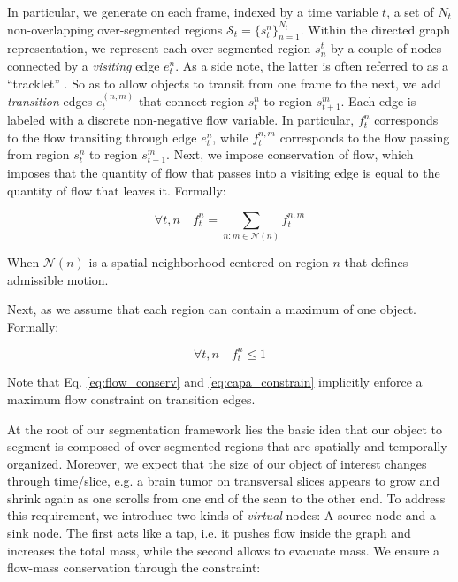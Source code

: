 In particular, we generate on each frame, indexed by a time variable $t$, a set of $N_{t}$ non-overlapping over-segmented regions $\mathcal{S}_{t}=\{s_{t}^{n}\}_{n=1}^{N_{t}}$.
Within the directed graph representation, we represent each over-segmented region $s^{t}_{n}$ by a couple of nodes connected by a \textit{visiting} edge $e^{n}_{t}$.
As a side note, the latter is often referred to as a ``tracklet'' \cite{zhang08}.
So as to allow objects to transit from one frame to the next, we add \textit{transition} edges $e^{(n,m)}_{t}$ that connect region $s^{n}_{t}$ to region $s^{m}_{t+1}$.
Each edge is labeled with a discrete non-negative flow variable.
In particular, $f_{t}^{n}$ corresponds to the flow transiting through edge $e_{t}^{n}$, while $f_{t}^{n,m}$ corresponds to the flow passing from region $s_{t}^{n}$ to region $s_{t+1}^{m}$.
Next, we impose conservation of flow, which imposes that the quantity of flow that passes into a visiting edge is equal to the quantity of flow that leaves it. Formally:

\begin{equation}
  \label{eq:flow_conserv}
  \forall t,n \quad f_{t}^{n} = \sum_{n:m\in \mathcal{N}(n)}f_{t}^{n,m}
\end{equation}

When $\mathcal{N}(n)$ is a spatial neighborhood centered on region $n$ that defines admissible motion.

Next, as we assume that each region can contain a maximum of one object. Formally:

\begin{equation}
  \label{eq:capa_constrain}
  \forall t,n \quad f_{t}^{n} \leq 1
\end{equation}

Note that Eq. \ref{eq:flow_conserv} and \ref{eq:capa_constrain} implicitly enforce a maximum flow constraint on transition edges.

At the root of our segmentation framework lies the basic idea that our object to segment is composed of over-segmented regions that are spatially and temporally organized.
Moreover, we expect that the size of our object of interest changes through time/slice, e.g. a brain tumor on transversal slices appears to grow and shrink again as one scrolls from one end of the scan to the other end.
To address this requirement, we introduce two kinds of \textit{virtual} nodes: A source node and a sink node.
The first acts like a tap, i.e. it pushes flow inside the graph and increases the total mass, while the second allows to evacuate mass.
We ensure a flow-mass conservation through the constraint:

